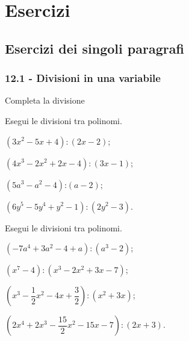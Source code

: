 
\section{Esercizi}
\subsection{Esercizi dei singoli paragrafi}
\subsubsection*{12.1 - Divisioni in una variabile}

\begin{esercizio}
\label{ese:12.1}
Completa la divisione
\begin{center}
 
\end{center}
\end{esercizio}

\begin{esercizio}[\Ast]
\label{ese:12.2}
Esegui le divisioni tra polinomi.
 \begin{enumeratea}
 \item $\left(3x^{2}-5x+4\right):\left(2x-2\right)$;
 \item $\left(4x^{3}-2x^{2}+2x-4\right):\left(3x-1\right)$;
 \item $\left(5a^{3}-a^{2}-4\right)\text{:}\left(a-2\right)$;
 \item $\left(6y^{5}-5y^{4}+y^{2}-1\right):\left(2y^{2}-3\right)$.
 \end{enumeratea}
\end{esercizio}

\begin{esercizio}[\Ast]
\label{ese:12.3}
Esegui le divisioni tra polinomi.
 \begin{enumeratea}
 \item $\left(-7a^{4}+3a^{2}-4+a\right):\left(a^{3}-2\right)$;
 \item $\left(x^{7}-4\right):\left(x^{3}-2x^{2}+3x-7\right)$;
 \item $\left(x^{3}-\dfrac{1}{2}x^{2}-4x+\dfrac{3}{2}\right):\left(x^{2}+3x\right)$;
 \item $\left(2x^{4}+2x^{3}-\dfrac{15}{2}x^{2}-15x-7\right):(2x+3)$.
 \end{enumeratea}
\end{esercizio}

